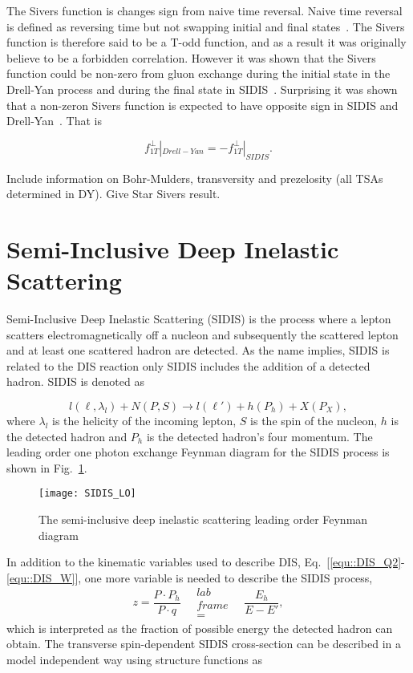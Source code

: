 The Sivers function is changes sign from naive time reversal.  Naive time
reversal is defined as reversing time but not swapping initial and final
states~\cite{Bacchetta:2006tn}.  The Sivers function is therefore said to be a
T-odd function, and as a result it was originally believe to be a forbidden
correlation.  However it was shown that the Sivers function could be non-zero
from gluon exchange during the initial state in the Drell-Yan process and during
the final state in SIDIS~\cite{Brodsky:2002cx,Brodsky:2002rv}.  Surprising it
was shown that a non-zeron Sivers function is expected to have opposite sign in
SIDIS and Drell-Yan~\cite{collins_2002}.  That is

\begin{equation}
  f_{1T}^{\bot} |_{Drell-Yan} = - f_{1T}^{\bot} |_{SIDIS}.
\end{equation}


Include information on Bohr-Mulders, transversity and prezelosity (all TSAs
determined in DY).  Give Star Sivers result.

\section{Semi-Inclusive Deep Inelastic Scattering} \label{sec::SIDIS}
Semi-Inclusive Deep Inelastic Scattering (SIDIS) is the process where a lepton
scatters electromagnetically off a nucleon and subsequently the scattered lepton
and at least one scattered hadron are detected.  As the name implies, SIDIS is
related to the DIS reaction only SIDIS includes the addition of a detected
hadron.  SIDIS is denoted as

\begin{equation}
  l(\ell, \lambda_l) + N(P, S) \rightarrow l(\ell') + h(P_h) + X(P_X),
\end{equation}
\noindent
where $\lambda_l$ is the helicity of the incoming lepton, $S$ is the spin of the
nucleon, $h$ is the detected hadron and $P_h$ is the detected hadron's four
momentum.  The leading order one photon exchange Feynman diagram for the SIDIS
process is shown in Fig.~\ref{fig::SIDIS_LO}.

\begin{figure}[h!t]
  \centering
  \texttt{[image: SIDIS\_LO]}
  \caption{The semi-inclusive deep inelastic scattering leading order Feynman
    diagram}
  \label{fig::SIDIS_LO}
\end{figure}

In addition to the kinematic variables used to describe DIS,
Eq.~[\ref{equ::DIS_Q2}-\ref{equ::DIS_W}], one more variable is needed to
describe the SIDIS process,
\begin{equation}
  z = \frac{P \cdot P_h}{P \cdot q} \quad \substack{lab \\frame\\ =} \quad
  \frac{E_h}{E-E'},
\end{equation}
\noindent
which is interpreted as the fraction of possible energy the detected hadron
can obtain.  The transverse spin-dependent SIDIS cross-section can be described
in a model independent way using structure functions as~\cite{Bacchetta:2006tn}

